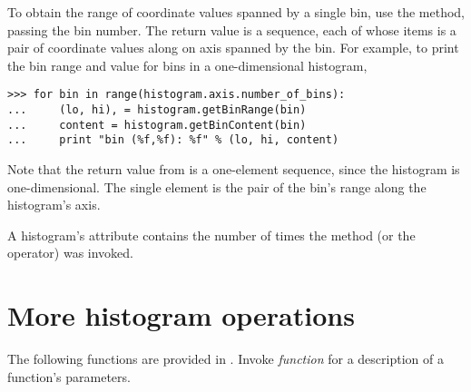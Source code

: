 To obtain the range of coordinate values spanned by a single bin, use
the  method, passing the bin number.  The return
value is a sequence, each of whose items is a  pair of
coordinate values along on axis spanned by the bin.  For example, to
print the bin range and value for bins in a one-dimensional histogram,
\begin{verbatim}
>>> for bin in range(histogram.axis.number_of_bins):
...     (lo, hi), = histogram.getBinRange(bin)
...     content = histogram.getBinContent(bin)
...     print "bin (%f,%f): %f" % (lo, hi, content)
\end{verbatim}
Note that the return value from  is a one-element
sequence, since the histogram is one-dimensional.  The single element is
the pair  of the bin's range along the histogram's axis.

A histogram's  attribute contains the number
of times the  method (or the \code{<<} operator) was
invoked.


\section{More histogram operations}

The following functions are provided in .  Invoke
\textit{function}\code{)} for a description of a
function's parameters.

